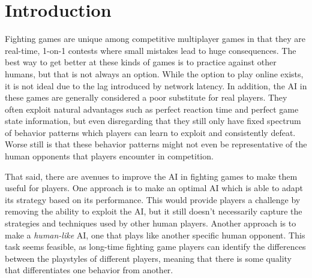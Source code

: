 
\chapter{Introduction} %

\label{Chapter1} %


\newcommand{\keyword}[1]{\textbf{#1}}
\newcommand{\tabhead}[1]{\textbf{#1}}
\newcommand{\code}[1]{\texttt{#1}}
\newcommand{\file}[1]{\texttt{\bfseries#1}}
\newcommand{\option}[1]{\texttt{\itshape#1}}



Fighting games are unique among competitive multiplayer games in that they are real-time, 1-on-1 contests where small mistakes lead to huge consequences. The best way to get better at these kinds of games is to practice against other humans, but that is not always an option. While the option to play online exists, it is not ideal due to the lag introduced by network latency. In addition, the AI in these games are generally considered a poor substitute for real players. They often exploit natural advantages such as perfect reaction time and perfect game state information, but even disregarding that they still only have fixed spectrum of behavior patterns which players can learn to exploit and consistently defeat. Worse still is that these behavior patterns might not even be representative of the human opponents that players encounter in competition.

That said, there are avenues to improve the AI in fighting games to make them useful for players. One approach is to make an optimal AI which is able to adapt its strategy based on its performance. This would provide players a challenge by removing the ability to exploit the AI, but it still doesn't necessarily capture the strategies and techniques used by other human players. Another approach is to make a \textit{human-like} AI, one that plays like another specific human opponent. This task seems feasible, as long-time fighting game players can identify the differences between the playstyles of different players, meaning that there is some quality that differentiates one behavior from another.

